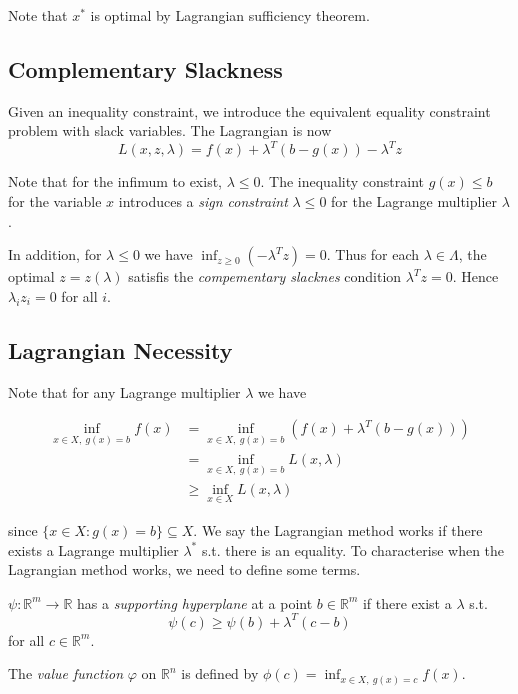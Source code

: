 \documentclass[a4paper]{article}
\begin{document}
Note that $x^*$ is optimal by Lagrangian sufficiency theorem.

\subsection{Complementary Slackness}

Given an inequality constraint, we introduce the equivalent equality constraint problem with slack variables. The Lagrangian is now
\[
  L(x, z, \lambda) = f(x) + \lambda^T (b - g(x)) - \lambda^T z
\]

Note that for the infimum to exist, $\lambda ≤ 0$. The inequality constraint $g(x) ≤ b $ for the variable $x$ introduces a \emph{sign constraint} $\lambda ≤ 0$ for the Lagrange multiplier $\lambda$.

In addition, for $\lambda ≤ 0$ we have $\displaystyle \inf_{z ≥ 0} (-\lambda^T z) = 0$. Thus for each $\lambda \in \Lambda$, the optimal $z = z(\lambda)$ satisfis the \emph{compementary slacknes} condition $\lambda^T z = 0$. Hence $\lambda_i z_i = 0$ for all $i$.

\subsection{Lagrangian Necessity}

Note that for any Lagrange multiplier $\lambda$ we have

\begin{align*}
  \inf_{x \in X,\: g(x) = b} f(x) &= \inf_{x \in X,\: g(x) = b} (f(x) + \lambda^T (b - g(x))) \\
                                &= \inf_{x \in X,\: g(x) = b} L(x, \lambda) \\
                                &≥ \inf_{x \in X} L(x, \lambda)
\end{align*}

since $\{x \in X: g(x) = b\} ⊆ X$. We say the Lagrangian method works if there exists a Lagrange multiplier $\lambda^*$ s.t. there is an equality. To characterise when the Lagrangian method works, we need to define some terms.

\begin{definition}
  $\psi: \mathbb{R}^m → \mathbb{R}$ has a \emph{supporting hyperplane} at a point $b \in \mathbb{R}^m$ if there exist a $\lambda$ s.t.
  \[
    \psi(c) ≥ \psi(b) + \lambda^T (c-b)
  \]
  for all $c \in \mathbb{R}^m$.
\end{definition}

\begin{definition}
  The \emph{value function} $φ$ on $\mathbb{R}^n$ is defined by $\displaystyle\phi(c) = \inf_{x \in X,\: g(x) = c} f(x)$.
\end{definition}
\end{document}

